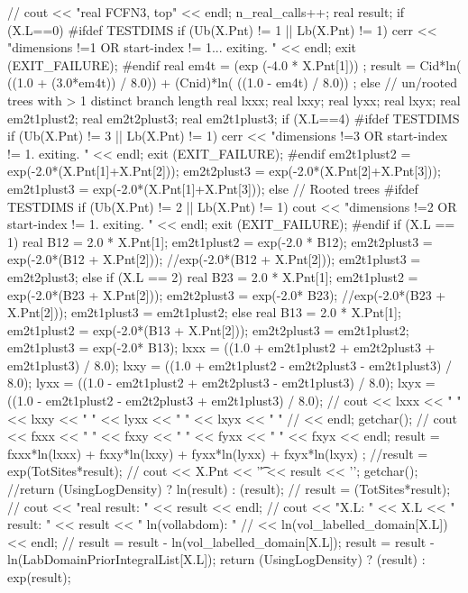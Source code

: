 \begin{DoxyCode}
{
  //  cout << "real FCFN3, top" << endl;
  n_real_calls++;
  real result;
  if (X.L==0)       
  {
    #ifdef TESTDIMS
    if (Ub(X.Pnt) != 1 || Lb(X.Pnt) != 1)
    {
      cerr << "dimensions !=1 OR start-index != 1... exiting. " 
           << endl; exit (EXIT_FAILURE);
    }
    #endif
    real em4t = (exp (-4.0 * X.Pnt[1])) ;
    result = Cid*ln( ((1.0 + (3.0*em4t)) / 8.0)) + 
             (Cnid)*ln( ((1.0 - em4t) / 8.0)) ;
  }
  else              // un/rooted trees with > 1 distinct branch length
  {
    real lxxx;
    real lxxy;
    real lyxx;
    real lxyx;
    real em2t1plust2;
    real em2t2plust3;
    real em2t1plust3;
    if (X.L==4)     
    {
      #ifdef TESTDIMS
      if (Ub(X.Pnt) != 3 || Lb(X.Pnt) != 1)
      {
        cerr << "dimensions !=3 OR start-index != 1. exiting. " 
             << endl; exit (EXIT_FAILURE);
      }
      #endif
      em2t1plust2 = exp(-2.0*(X.Pnt[1]+X.Pnt[2]));
      em2t2plust3 = exp(-2.0*(X.Pnt[2]+X.Pnt[3]));
      em2t1plust3 = exp(-2.0*(X.Pnt[1]+X.Pnt[3]));
    }
    else            // Rooted trees
    {
      #ifdef TESTDIMS
      if (Ub(X.Pnt) != 2 || Lb(X.Pnt) != 1)
      {
        cout << "dimensions !=2 OR start-index != 1. exiting. " 
             << endl; exit (EXIT_FAILURE);
      }
      #endif
      if (X.L == 1) 
      {
        real B12 = 2.0 * X.Pnt[1];
        em2t1plust2 = exp(-2.0 * B12);
        em2t2plust3 = exp(-2.0*(B12 + X.Pnt[2]));
                    //exp(-2.0*(B12 + X.Pnt[2]));
        em2t1plust3 = em2t2plust3;
      }
      else if (X.L == 2)
      {
        real B23 = 2.0 * X.Pnt[1];
        em2t1plust2 = exp(-2.0*(B23 + X.Pnt[2]));
        em2t2plust3 = exp(-2.0* B23);
                    //exp(-2.0*(B23 + X.Pnt[2]));
        em2t1plust3 = em2t1plust2;
      }
      else          
      {
        real B13 = 2.0 * X.Pnt[1];
        em2t1plust2 = exp(-2.0*(B13 + X.Pnt[2]));
        em2t2plust3 = em2t1plust2;
        em2t1plust3 = exp(-2.0* B13);
      }
    }
    lxxx = ((1.0 + em2t1plust2 + em2t2plust3 + em2t1plust3) / 8.0);
    lxxy = ((1.0 + em2t1plust2 - em2t2plust3 - em2t1plust3) / 8.0);
    lyxx = ((1.0 - em2t1plust2 + em2t2plust3 - em2t1plust3) / 8.0);
    lxyx = ((1.0 - em2t1plust2 - em2t2plust3 + em2t1plust3) / 8.0);
    //  cout << lxxx << "  " << lxxy << "  " << lyxx << "  " << lxyx << "  " 
    //       << endl; getchar();
    //  cout << fxxx << "  " << fxxy << "  " << fyxx << "  " << fxyx << endl;
    result = fxxx*ln(lxxx) + fxxy*ln(lxxy) + fyxx*ln(lyxx) + fxyx*ln(lxyx) ;
  }
  //result = exp(TotSites*result);
  //  cout << X.Pnt << '\t' << result << '\n'; getchar();
  //return (UsingLogDensity) ? ln(result) : (result);
  // result = (TotSites*result);
  //  cout << "real result: " << result << endl;
  //   cout << "X.L:  " << X.L << " result: " << result << "  ln(vollabdom): " 
  //        <<  ln(vol_labelled_domain[X.L]) << endl;
  // result = result - ln(vol_labelled_domain[X.L]);
  result = result - ln(LabDomainPriorIntegralList[X.L]);
  return (UsingLogDensity) ? (result) : exp(result);
}
\end{DoxyCode}


